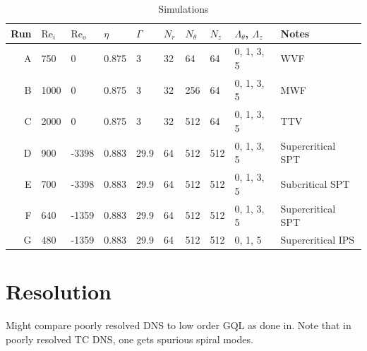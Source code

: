 \documentclass[openacc]{rstransa}%
\newcommand{\Reyn}{\mathrm{Re}}
\begin{document}
\begin{table}[!h]
\caption{Simulations}
\label{tab:simulations}
\begin{tabular}{rlllllllll}
\hline
Run & $\Reyn_i$ & $\Reyn_o$ & $\eta$ & $\Gamma$  & $N_r$ & $N_\theta$ & $N_z$& $\Lambda_\theta$, $\Lambda_z$ & Notes\\
\hline
A & 750  & 0 & 0.875  & 3 & 32 & 64 & 64 & 0, 1, 3, 5 & WVF\\
B & 1000 & 0 & 0.875 & 3 & 32 & 256 & 64 & 0, 1, 3, 5 & MWF\\
C & 2000 & 0 & 0.875 & 3 & 32 & 512 & 64 & 0, 1, 3, 5 & TTV\\
\hline
D & 900 & -3398 & 0.883 & 29.9 & 64 & 512 & 512 & 0, 1, 3, 5 & Supercritical SPT\\
E & 700 & -3398 & 0.883 & 29.9 & 64 & 512 & 512 & 0, 1, 3, 5 & Subcritical SPT\\
\hline
F & 640 & -1359 & 0.883 & 29.9 & 64 & 512 & 512 & 0, 1, 3, 5 & Supercritical SPT\\
G & 480 & -1359 & 0.883 & 29.9 & 64 & 512 & 512 & 0, 1, 5 & Supercritical IPS\\
\end{tabular}
\vspace*{-4pt}
\end{table}%

\section{Resolution}
Might compare poorly resolved DNS to low order GQL as done in\cite{2017JFM...810..412T}. Note that in poorly resolved TC DNS, one gets spurious spiral modes.

\end{document}
